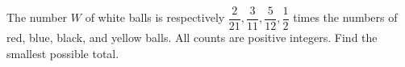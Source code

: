 The number $W$ of white balls is respectively $\dfrac{2}{21},\dfrac{3}{11},\dfrac{5}{12},\dfrac{1}{2}$ times the numbers of red, blue, black, and yellow balls. All counts are positive integers. Find the smallest possible total.
